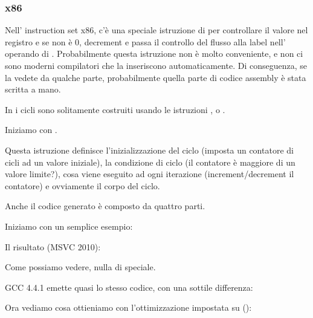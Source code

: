 \subsubsection{x86}


Nell' instruction set x86, c'è una speciale istruzione di \LOOP per controllare il valore nel registro \ECX e
se non è 0, \gls{decrement} \ECX
e passa il controllo del flusso alla label nell' operando di \LOOP. 
Probabilmente questa istruzione non è molto conveniente, e non ci sono moderni compilatori che la inseriscono automaticamente.
Di conseguenza, se la vedete da qualche parte, probabilmente quella parte di codice assembly è stata scritta a mano.

\par

In \CCpp i cicli sono solitamente costruiti usando le istruzioni ,  o .

Iniziamo con .

Questa istruzione definisce l'inizializzazione del ciclo (imposta un contatore di cicli ad un valore iniziale), 
la condizione di ciclo (il contatore è maggiore di un valore limite?), cosa viene eseguito ad ogni iterazione (\gls{increment}/\gls{decrement} il contatore)
e ovviamente il corpo del ciclo.



Anche il codice generato è composto da quattro parti.

Iniziamo con un semplice esempio:



Il risultato (MSVC 2010):



Come possiamo vedere, nulla di speciale.

GCC 4.4.1 emette quasi lo stesso codice, con una sottile differenza:



Ora vediamo cosa ottieniamo con l'ottimizzazione impostata su (\TT{\Ox}):



